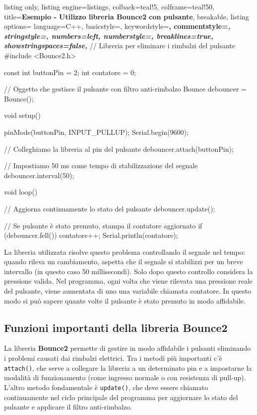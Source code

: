 \begin{tcblisting}{
    listing only,
    listing engine=listings,
    colback=teal!5,
    colframe=teal!50,
    title=\textbf{Esempio - Utilizzo libreria Bounce2 con pulsante},
    breakable,
    listing options={
        language=C++,
        basicstyle=\ttfamily\small,
        keywordstyle=\color{blue!80!black}\bfseries,
        commentstyle=\color{green!50!black}\itshape,
        stringstyle=\color{orange!80!black},
        numbers=left,
        numberstyle=\tiny\color{gray},
        breaklines=true,
        showstringspaces=false,
    }
}
// Libreria per eliminare i rimbalzi del pulsante
#include <Bounce2.h>   

const int buttonPin = 2;
int contatore = 0;

// Oggetto che gestisce il pulsante con filtro anti-rimbalzo
Bounce debouncer = Bounce(); 

void setup() {
    pinMode(buttonPin, INPUT_PULLUP);
    Serial.begin(9600);

    // Colleghiamo la libreria al pin del pulsante
    debouncer.attach(buttonPin);  

    // Impostiamo 50 ms come tempo di stabilizzazione del segnale
    debouncer.interval(50);  
    
}

void loop() {
    // Aggiorna continuamente lo stato del pulsante 
    debouncer.update();  

    // Se pulsante è stato premuto, stampa il contatore aggiornato
    if (debouncer.fell()) {
        contatore++;
        Serial.println(contatore);
    }
}
\end{tcblisting}

La libreria utilizzata risolve questo problema controllando il segnale nel tempo: quando rileva un cambiamento, aspetta che il segnale si stabilizzi per un breve intervallo (in questo caso 50 millisecondi). Solo dopo questo controllo considera la pressione valida.
Nel programma, ogni volta che viene rilevata una pressione reale del pulsante, viene aumentata di uno una variabile chiamata contatore. In questo modo si può sapere quante volte il pulsante è stato premuto in modo affidabile.

\subsection*{Funzioni importanti della libreria Bounce2}
La libreria \textbf{Bounce2} permette di gestire in modo affidabile i pulsanti eliminando i problemi causati dai rimbalzi elettrici. Tra i metodi più importanti c’è \texttt{attach()}, che serve a collegare la libreria a un determinato pin e a impostarne la modalità di funzionamento (come ingresso normale o con resistenza di pull-up). L'altro metodo fondamentale è \texttt{update()}, che deve essere chiamato continuamente nel ciclo principale del programma per aggiornare lo stato del pulsante e applicare il filtro anti-rimbalzo.


